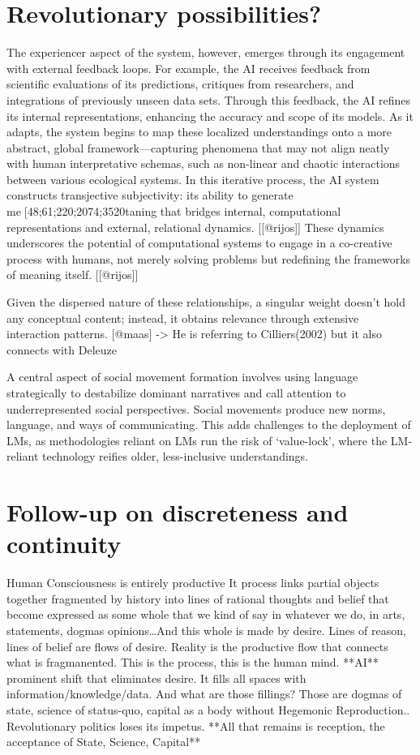 \section{Revolutionary possibilities?}
The experiencer aspect of the system, however, emerges through its engagement with external feedback loops. For example, the AI receives feedback from scientific evaluations of its predictions, critiques from researchers, and integrations of previously unseen data sets. Through this feedback, the AI refines its internal representations, enhancing the accuracy and scope of its models. As it adapts, the system begins to map these localized understandings onto a more abstract, global framework—capturing phenomena that may not align neatly with human interpretative schemas, such as non-linear and chaotic interactions between various ecological systems. In this iterative process, the AI system constructs transjective subjectivity: its ability to generate me[48;61;220;2074;3520taning that bridges internal, computational representations and external, relational dynamics. [[@rijos]]
These dynamics underscores the potential of computational systems to engage in a co-creative process with humans, not merely solving problems but redefining the frameworks of meaning itself. [[@rijos]]

Given the dispersed nature of these relationships, a singular weight doesn’t hold any conceptual content; instead, it obtains relevance through extensive interaction patterns. [@maas] -> He is referring to Cilliers(2002) but it also connects with Deleuze

A central aspect of social movement formation involves using language strategically to destabilize dominant narratives and call attention to underrepresented social perspectives. Social movements produce new norms, language, and ways of communicating. This adds challenges to the deployment of LMs, as methodologies reliant on LMs run the risk of ‘value-lock’, where the LM-reliant technology reifies older, less-inclusive understandings. \cite[614]{bender2021b}

\section{Follow-up on discreteness and continuity}
Human Consciousness is entirely productive
It process links partial objects together fragmented by history into lines of rational thoughts and belief that become expressed as some whole that we kind of say in whatever we do, in arts, statements, dogmas opinions…And this whole is made by desire. Lines of reason, lines of belief are flows of desire.
Reality is the productive flow that connects what is fragmanented. This is the process, this is the human mind.
**AI** prominent shift that eliminates desire. It fills all spaces with information/knowledge/data. And what are those fillings? Those are dogmas of state, science of status-quo, capital as a body without  Hegemonic Reproduction..
Revolutionary politics loses its impetus. **All that remains is reception, the acceptance of State, Science, Capital**
\cite{creativephilosophy2023}


